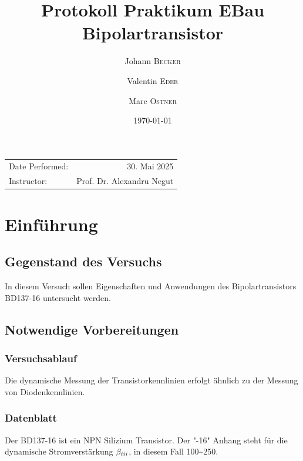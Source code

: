 \documentclass[
	a4paper, %
	12pt, %
]{CSUniSchoolLabReport}
\title{Protokoll Praktikum EBau Bipolartransistor} %
\author{Johann \textsc{Becker} \and Valentin \textsc{Eder} \and Marc \textsc{Ostner}}
\date{\today} %
\newcommand{\RNum}[1]{\uppercase\expandafter{\romannumeral #1\relax}}%
\begin{document}
\maketitle %


\begin{center}
	\begin{tabular}{l r}
		Date Performed: & 30. Mai 2025 \\ %
		
		Instructor: & Prof. Dr. Alexandru Negut %
	\end{tabular}
\end{center}



\section{Einführung}
\subsection{Gegenstand des Versuchs}
In diesem Versuch sollen Eigenschaften und Anwendungen des Bipolartransistors BD137-16 untersucht werden.
\subsection{Notwendige Vorbereitungen}
\subsubsection{Versuchsablauf}
Die dynamische Messung der Transistorkennlinien erfolgt ähnlich zu der Messung von Diodenkennlinien.
\subsubsection{Datenblatt}
Der BD137-16 ist ein NPN Silizium Transistor. 
Der "-16" Anhang steht für die dynamische Stromverstärkung $\beta_{\RNum{3}}$, in diesem Fall 100\textasciitilde 250. 
\end{document}
